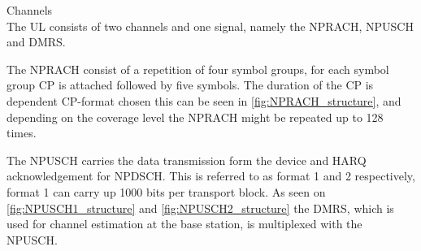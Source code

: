 Channels\\
The \gls{UL} consists of two channels and one signal, namely the \gls{NPRACH}, \gls{NPUSCH} and \gls{DMRS}.

The \gls{NPRACH} consist of a repetition of four symbol groups, for each symbol group \gls{CP} is attached followed by five symbols. The duration of the CP is dependent CP-format chosen this can be seen in \autoref{fig:NPRACH_structure}, and depending on the coverage level the \gls{NPRACH} might be repeated up to 128 times. \citep{NB-IoT_Book}

The \gls{NPUSCH} carries the data transmission form the device and \gls{HARQ} acknowledgement for \gls{NPDSCH}. This is referred to as format 1 and 2 respectively, format 1 can carry up 1000 bits per transport block. As seen on \autoref{fig:NPUSCH1_structure} and \autoref{fig:NPUSCH2_structure} the DMRS, which is used for channel estimation at the base station, is multiplexed with the NPUSCH. 



